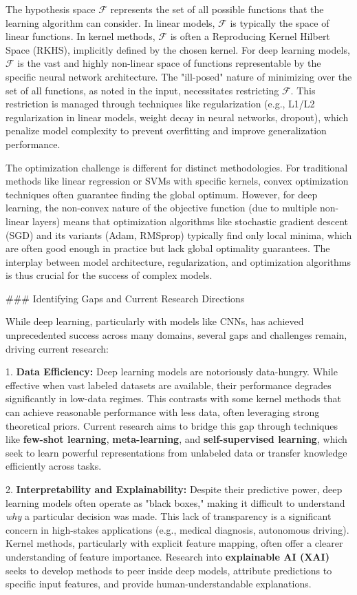 \documentclass{article}
\begin{document}
The hypothesis space $\mathcal{F}$ represents the set of all possible functions that the learning algorithm can consider. In linear models, $\mathcal{F}$ is typically the space of linear functions. In kernel methods, $\mathcal{F}$ is often a Reproducing Kernel Hilbert Space (RKHS), implicitly defined by the chosen kernel. For deep learning models, $\mathcal{F}$ is the vast and highly non-linear space of functions representable by the specific neural network architecture. The "ill-posed" nature of minimizing over the set of all functions, as noted in the input, necessitates restricting $\mathcal{F}$. This restriction is managed through techniques like regularization (e.g., L1/L2 regularization in linear models, weight decay in neural networks, dropout), which penalize model complexity to prevent overfitting and improve generalization performance.

The optimization challenge is different for distinct methodologies. For traditional methods like linear regression or SVMs with specific kernels, convex optimization techniques often guarantee finding the global optimum. However, for deep learning, the non-convex nature of the objective function (due to multiple non-linear layers) means that optimization algorithms like stochastic gradient descent (SGD) and its variants (Adam, RMSprop) typically find only local minima, which are often good enough in practice but lack global optimality guarantees. The interplay between model architecture, regularization, and optimization algorithms is thus crucial for the success of complex models.

\#\#\# Identifying Gaps and Current Research Directions

While deep learning, particularly with models like CNNs, has achieved unprecedented success across many domains, several gaps and challenges remain, driving current research:

1.  \textbf{Data Efficiency:} Deep learning models are notoriously data-hungry. While effective when vast labeled datasets are available, their performance degrades significantly in low-data regimes. This contrasts with some kernel methods that can achieve reasonable performance with less data, often leveraging strong theoretical priors. Current research aims to bridge this gap through techniques like \textbf{few-shot learning}, \textbf{meta-learning}, and \textbf{self-supervised learning}, which seek to learn powerful representations from unlabeled data or transfer knowledge efficiently across tasks.

2.  \textbf{Interpretability and Explainability:} Despite their predictive power, deep learning models often operate as "black boxes," making it difficult to understand \textit{why} a particular decision was made. This lack of transparency is a significant concern in high-stakes applications (e.g., medical diagnosis, autonomous driving). Kernel methods, particularly with explicit feature mapping, often offer a clearer understanding of feature importance. Research into \textbf{explainable AI (XAI)} seeks to develop methods to peer inside deep models, attribute predictions to specific input features, and provide human-understandable explanations.
\end{document}
